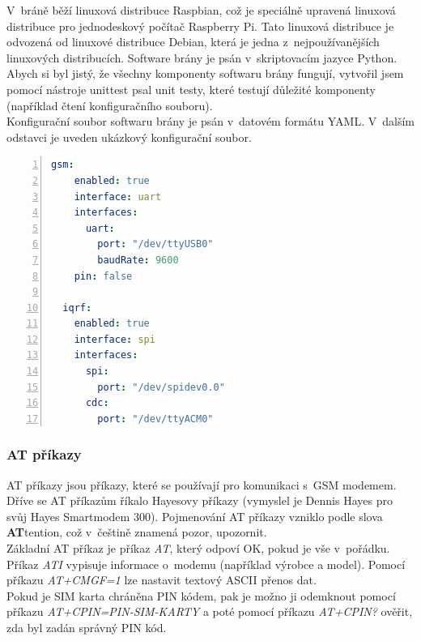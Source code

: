 \documentclass[12pt,a4paper,oneside]{article}
\begin{document}
V~bráně běží linuxová distribuce Raspbian, což je speciálně upravená linuxová distribuce pro jednodeskový počítač Raspberry Pi. Tato linuxová distribuce je odvozená od linuxové distribuce Debian, která je jedna z~nejpoužívanějších linuxových distribucích. Software brány je psán v~skriptovacím jazyce Python. Abych si byl jistý, že všechny komponenty softwaru brány fungují, vytvořil jsem pomocí nástroje unittest psal unit testy, které testují důležité komponenty (například čtení konfiguračního souboru). \\

Konfigurační soubor softwaru brány je psán v~datovém formátu YAML. V~dalším odstavci je uveden ukázkový konfigurační soubor.

\begin{lstlisting}[language=yaml, numbers=left]
  gsm:
    enabled: true
    interface: uart
    interfaces:
      uart:
        port: "/dev/ttyUSB0"
        baudRate: 9600
    pin: false

  iqrf:
    enabled: true
    interface: spi
    interfaces:
      spi:
        port: "/dev/spidev0.0"
      cdc:
        port: "/dev/ttyACM0"
\end{lstlisting}

\newpage

\subsubsection{AT příkazy}

AT příkazy jsou příkazy, které se používají pro komunikaci s~GSM modemem. Dříve se AT příkazům říkalo Hayesovy příkazy (vymyslel je Dennis Hayes pro svůj Hayes Smartmodem 300). Pojmenování AT příkazy vzniklo podle slova \textbf{AT}tention, což v~češtině znamená pozor, upozornit. \\

Základní AT příkaz je příkaz \textit{AT}, který odpoví OK, pokud je vše v~pořádku. Příkaz \textit{ATI} vypisuje informace o~modemu (například výrobce a model). Pomocí příkazu \textit{AT+CMGF=1} lze nastavit textový ASCII přenos dat. \\

Pokud je SIM karta chráněna PIN kódem, pak je možno ji odemknout pomocí příkazu \textit{AT+CPIN=PIN-SIM-KARTY} a poté pomocí příkazu \textit{AT+CPIN?} ověřit, zda byl zadán správný PIN kód. \\
\end{document}
